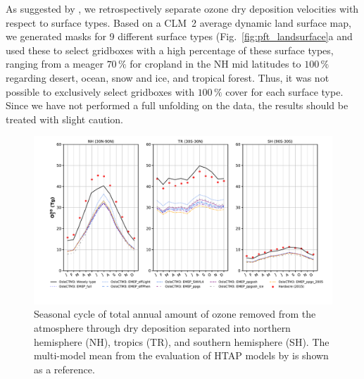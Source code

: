 \documentclass[gmd, manuscript]{copernicus}
\begin{document}
As suggested by \citet{ACP:Hardacre2015}, we retrospectively separate ozone dry deposition velocities with respect to surface types. Based on a CLM~2 average dynamic land surface map, we generated masks for 9 different surface types (Fig.~\ref{fig:pft_landsurface}a and used these to select gridboxes with a high percentage of these surface types, ranging from a meager $70\,\unit{\%}$ for cropland in the NH mid latitudes to $100\,\unit{\%}$ regarding desert, ocean, snow and ice, and tropical forest. Thus, it was not possible to exclusively select gridboxes with $100\,\unit{\%}$ cover for each surface type. Since we have not performed a full unfolding on the data, the results should be treated with slight caution. 
%
\begin{figure}[t]
  \includegraphics[width=12cm]{fig06}
  \caption{Seasonal cycle of total annual amount of ozone removed from the atmosphere through dry deposition separated into northern hemisphere (NH), tropics (TR), and southern hemisphere (SH). The multi-model mean from the evaluation of HTAP models by \citet{ACP:Hardacre2015} is shown as a reference.}
  \label{fig:mmm_drydep_hem}
\end{figure}
%
\end{document}
